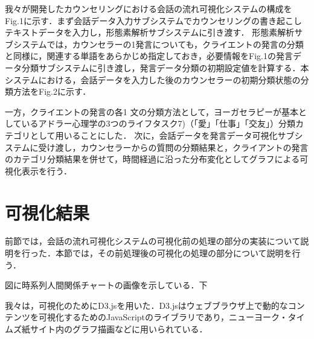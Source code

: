 \documentclass[shuuron]{kuee}
\begin{document}
我々\cite{uetsuji}が開発したカウンセリングにおける会話の流れ可視化システムの構成をFig.1に示す．まず会話データ入力サブシステムでカウンセリングの書き起こしテキストデータを入力し，形態素解析サブシステムに引き渡す．
形態素解析サブシステムでは，カウンセラーの1発言についても，クライエントの発言の分類と同様に，関連する単語をあらかじめ指定しておき，必要情報をFig.1の発言データ分類サブシステムに引き渡し，発言データ分類の初期設定値を計算する．本システムにおける，会話データを入力した後のカウンセラーの初期分類状態の分類方法をFig.2に示す．


一方，クライエントの発言の各1 文の分類方法として，ヨーガセラピーが基本としているアドラー心理学の3つのライフタスク7)（「愛」「仕事」「交友」）分類カテゴリとして用いることにした．
次に，会話データを発言データ可視化サブシステムに受け渡し，カウンセラーからの質問の分類結果と，クライアントの発言のカテゴリ分類結果を併せて，時間経過に沿った分布変化としてグラフによる可視化表示を行う．


\section{可視化結果}

前節では，会話の流れ可視化システムの可視化前の処理の部分の実装について説明を行った．本節では，その前処理後の可視化の処理の部分について説明を行う．



図に時系列人間関係チャートの画像を示している．下


我々は，可視化のためにD3.js\cite{vand3}を用いた．D3.jsはウェブブラウザ上で動的なコンテンツを可視化するためのJavaScriptのライブラリであり，ニューヨーク・タイムズ紙サイト内のグラフ描画などに用いられている．
\end{document}
